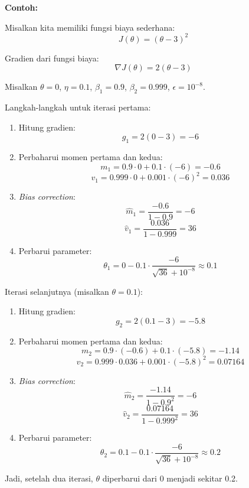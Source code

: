\textbf{Contoh:}

Misalkan kita memiliki fungsi biaya sederhana:
\[ 
J(\theta) = (\theta - 3)^2 
\]

Gradien dari fungsi biaya:
\[ 
\nabla J(\theta) = 2(\theta - 3) 
\]

Misalkan \(\theta = 0\), \(\eta = 0.1\), \(\beta_1 = 0.9\), \(\beta_2 = 0.999\), \(\epsilon = 10^{-8}\).

Langkah-langkah untuk iterasi pertama:

\begin{enumerate}
    \item Hitung gradien:
    \[
    g_1 = 2(0 - 3) = -6
    \]

    \item Perbaharui momen pertama dan kedua:
    \[
    m_1 = 0.9 \cdot 0 + 0.1 \cdot (-6) = -0.6
    \]
    \[
    v_1 = 0.999 \cdot 0 + 0.001 \cdot (-6)^2 = 0.036
    \]

    \item \textit{Bias correction}:
    \[
    \hat{m}_1 = \frac{-0.6}{1 - 0.9} = -6
    \]
    \[
    \hat{v}_1 = \frac{0.036}{1 - 0.999} = 36
    \]

    \item Perbarui parameter:
    \[
    \theta_1 = 0 - 0.1 \cdot \frac{-6}{\sqrt{36} + 10^{-8}} \approx 0.1
    \]
\end{enumerate}

Iterasi selanjutnya (misalkan \(\theta = 0.1\)):

\begin{enumerate}
    \item Hitung gradien:
    \[
    g_2 = 2(0.1 - 3) = -5.8
    \]

    \item Perbaharui momen pertama dan kedua:
    \[
    m_2 = 0.9 \cdot (-0.6) + 0.1 \cdot (-5.8) = -1.14
    \]
    \[
    v_2 = 0.999 \cdot 0.036 + 0.001 \cdot (-5.8)^2 = 0.07164
    \]

    \item \textit{Bias correction}:
    \[
    \hat{m}_2 = \frac{-1.14}{1 - 0.9^2} = -6
    \]
    \[
    \hat{v}_2 = \frac{0.07164}{1 - 0.999^2} = 36
    \]

    \item Perbarui parameter:
    \[
    \theta_2 = 0.1 - 0.1 \cdot \frac{-6}{\sqrt{36} + 10^{-8}} \approx 0.2
    \]
\end{enumerate}

Jadi, setelah dua iterasi, \(\theta\) diperbarui dari 0 menjadi sekitar 0.2.